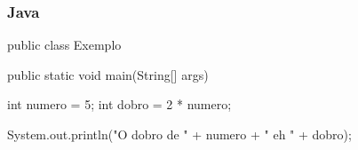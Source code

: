 
\begin{frame}[fragile]
    \frametitle{Java}
    
    \begin{java}
public class Exemplo {
    public static void main(String[] args) {
        int numero = 5;
        int dobro = 2 * numero;
        
        System.out.println("O dobro de " + numero +
                         " eh " + dobro);
    }
}
    \end{java}
\end{frame}